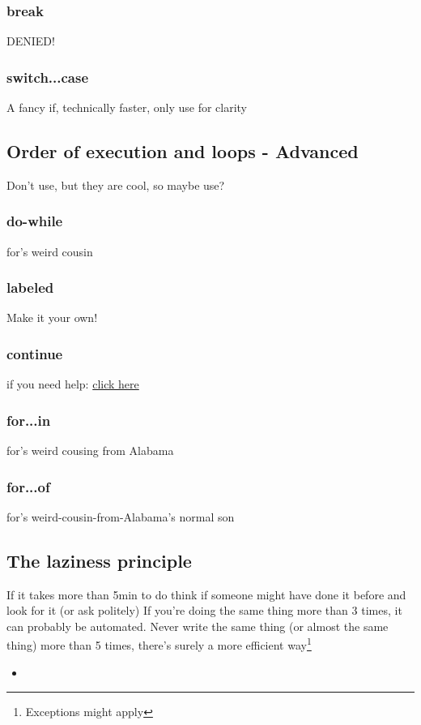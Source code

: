 \subsubsection{break}
\label{subsub:break}
DENIED!

\subsubsection{switch...case}
\label{subsub:switch}
A fancy if, technically faster, only use for clarity

\subsection{Order of execution and loops - Advanced}
\label{sub:execAdv}
Don't use, but they are cool, so maybe use?
\subsubsection{do-while}
\label{subsub:doWhile}
for's weird cousin

\subsubsection{labeled}
\label{subsub:labeled}
Make it your own!

\subsubsection{continue}
\label{subsub:continue}
if you need help: \href{http://letmegooglethat.com/?q=continue}{click here}

\subsubsection{for...in}
\label{subsub:forIn}
for's weird cousing from Alabama

\subsubsection{for...of}
\label{subsub:forOf}
for's weird-cousin-from-Alabama's normal son

\subsection{The laziness principle}
\label{sub:lazy}
If it takes more than 5min to do think if someone might have done it before and look for it (or ask politely)
If you're doing the same thing more than 3 times, it can probably be automated. Never write the same thing (or almost the same thing) more than 5 times, there's surely a more efficient way\footnote{Exceptions might apply}

\begin{itemize}
    \item
\end{itemize}
